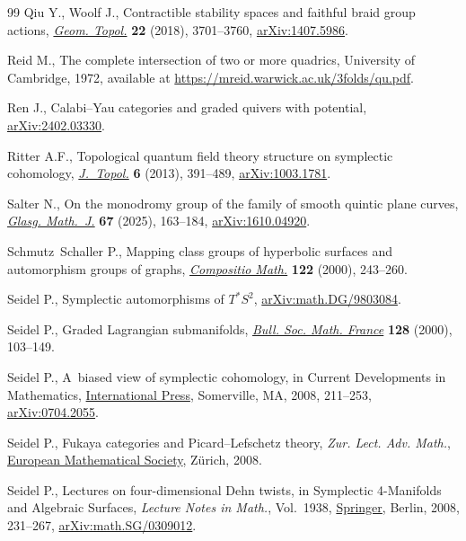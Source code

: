 \begin{thebibliography}{99}
Qiu Y., Woolf J., Contractible stability spaces and faithful braid group
 actions, \href{https://doi.org/10.2140/gt.2018.22.3701}{\textit{Geom.
 Topol.}} \textbf{22} (2018), 3701--3760,
 \href{http://arxiv.org/abs/1407.5986}{arXiv:1407.5986}.

Reid M., The complete intersection of two or more quadrics, {U}niversity of
 Cambridge, 1972, available at
 \url{https://mreid.warwick.ac.uk/3folds/qu.pdf}.

Ren J., Calabi--{Y}au categories and graded quivers with potential,
 \href{http://arxiv.org/abs/2402.03330}{arXiv:2402.03330}.

Ritter A.F., Topological quantum field theory structure on symplectic
 cohomology, \href{https://doi.org/10.1112/jtopol/jts038}{\textit{J.~Topol.}}
 \textbf{6} (2013), 391--489,
 \href{http://arxiv.org/abs/1003.1781}{arXiv:1003.1781}.

Salter N., On the monodromy group of the family of smooth quintic plane curves,
 \href{https://doi.org/10.1017/S0017089524000284}{\textit{Glasg. Math.~J.}}
 \textbf{67} (2025), 163--184,
 \href{http://arxiv.org/abs/1610.04920}{arXiv:1610.04920}.

Schmutz~Schaller P., Mapping class groups of hyperbolic surfaces and
 automorphism groups of graphs,
 \href{https://doi.org/10.1023/A:1002672721132}{\textit{Compositio Math.}}
 \textbf{122} (2000), 243--260.

Seidel P., Symplectic automorphisms of ${T}^*{S}^2$,
 \href{http://arxiv.org/abs/math.DG/9803084}{arXiv:math.DG/9803084}.


Seidel P., Graded {L}agrangian submanifolds,
 \href{https://doi.org/10.24033/bsmf.2365}{\textit{Bull. Soc. Math. France}}
 \textbf{128} (2000), 103--149.

Seidel P., A~biased view of symplectic cohomology, in Current Developments in
 Mathematics,
 \href{https://doi.org/10.4310/CDM.2006.v2006.n1.a4}{International Press},
 Somerville, MA, 2008, 211--253,
 \href{http://arxiv.org/abs/0704.2055}{arXiv:0704.2055}.

Seidel P., Fukaya categories and {P}icard--{L}efschetz theory, \textit{Zur. Lect. Adv.
 Math.}, \href{https://doi.org/10.4171/063}{European Mathematical Society},
 Z\"urich, 2008.

Seidel P., Lectures on four-dimensional {D}ehn twists, in Symplectic
 4-Manifolds and Algebraic Surfaces, \textit{Lecture Notes in Math.}, Vol.~1938, \href{https://doi.org/10.1007/978-3-540-78279-7_4}{Springer}, Berlin,
 2008, 231--267,
 \href{http://arxiv.org/abs/math.SG/0309012}{arXiv:math.SG/0309012}.


\end{thebibliography}
